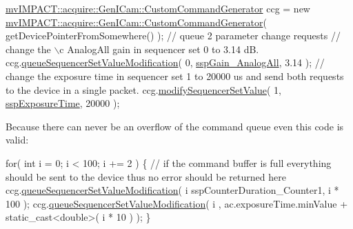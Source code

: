 \begin{DoxyCode}
\hyperlink{classmv_i_m_p_a_c_t_1_1acquire_1_1_gen_i_cam_1_1_custom_command_generator}{mvIMPACT::acquire::GenICam::CustomCommandGenerator} ccg = \textcolor{keyword}{
      new} \hyperlink{classmv_i_m_p_a_c_t_1_1acquire_1_1_gen_i_cam_1_1_custom_command_generator}{mvIMPACT::acquire::GenICam::CustomCommandGenerator}( 
      getDevicePointerFromSomewhere() );
\textcolor{comment}{// queue 2 parameter change requests}
\textcolor{comment}{// change the \(\backslash\)c AnalogAll gain in sequencer set 0 to 3.14 dB.}
ccg.\hyperlink{classmv_i_m_p_a_c_t_1_1acquire_1_1_gen_i_cam_1_1_custom_command_generator_ae18cd9ce7775ddb997e2a7c1414ded60}{queueSequencerSetValueModification}( 0, 
      \hyperlink{group___gen_i_cam_interface_gga458c2281fb19ba32fa6a49b02e0a976da12982df75ec50ed03752228f5b9a5086}{sspGain\_AnalogAll}, 3.14 );
\textcolor{comment}{// change the exposure time in sequencer set 1 to 20000 us and send both requests to the device in a single
       packet.}
ccg.\hyperlink{classmv_i_m_p_a_c_t_1_1acquire_1_1_gen_i_cam_1_1_custom_command_generator_ad692d5d184f37b146f3da67faf1da770}{modifySequencerSetValue}( 1, \hyperlink{group___gen_i_cam_interface_gga458c2281fb19ba32fa6a49b02e0a976da23cbccf7c89a18488ab68d5c16fe7519}{sspExposureTime}, 20000 );
\end{DoxyCode}


Because there can never be an overflow of the command queue even this code is valid\+: 
\begin{DoxyCode}
 \textcolor{keywordflow}{for}( \textcolor{keywordtype}{int} i = 0; i < 100; i += 2 )
 \{
   \textcolor{comment}{// if the command buffer is full everything should be sent to the device thus no error should be
       returned here}
   ccg.\hyperlink{classmv_i_m_p_a_c_t_1_1acquire_1_1_gen_i_cam_1_1_custom_command_generator_ae18cd9ce7775ddb997e2a7c1414ded60}{queueSequencerSetValueModification}( i %
      sspCounterDuration\_Counter1, i * 100 );
   ccg.\hyperlink{classmv_i_m_p_a_c_t_1_1acquire_1_1_gen_i_cam_1_1_custom_command_generator_ae18cd9ce7775ddb997e2a7c1414ded60}{queueSequencerSetValueModification}( i %
      , ac.exposureTime.minValue + static\_cast<double>( i * 10 ) );
\}
\end{DoxyCode}


